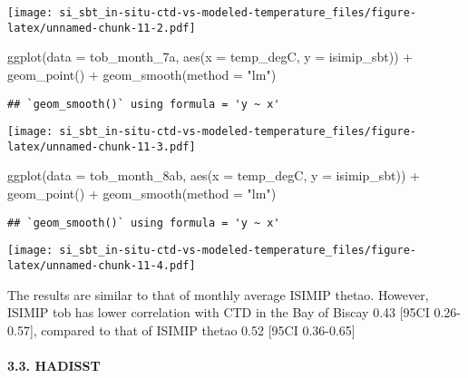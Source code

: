\documentclass[
]{article}
\newenvironment{Shaded}{\begin{snugshade}}{\end{snugshade}}
\newcommand{\AttributeTok}[1]{\textcolor[rgb]{0.77,0.63,0.00}{#1}}
\newcommand{\FunctionTok}[1]{\textcolor[rgb]{0.00,0.00,0.00}{#1}}
\newcommand{\NormalTok}[1]{#1}
\newcommand{\SpecialCharTok}[1]{\textcolor[rgb]{0.00,0.00,0.00}{#1}}
\newcommand{\StringTok}[1]{\textcolor[rgb]{0.31,0.60,0.02}{#1}}
\begin{document}
\texttt{[image: si\_sbt\_in-situ-ctd-vs-modeled-temperature\_files/figure-latex/unnamed-chunk-11-2.pdf]}

\begin{Shaded}
\begin{Highlighting}[]
\FunctionTok{ggplot}\NormalTok{(}\AttributeTok{data =}\NormalTok{ tob\_month\_7a, }\FunctionTok{aes}\NormalTok{(}\AttributeTok{x =}\NormalTok{ temp\_degC, }\AttributeTok{y =}\NormalTok{ isimip\_sbt)) }\SpecialCharTok{+} \FunctionTok{geom\_point}\NormalTok{() }\SpecialCharTok{+} \FunctionTok{geom\_smooth}\NormalTok{(}\AttributeTok{method =} \StringTok{"lm"}\NormalTok{)}
\end{Highlighting}
\end{Shaded}

\begin{verbatim}
## `geom_smooth()` using formula = 'y ~ x'
\end{verbatim}

\texttt{[image: si\_sbt\_in-situ-ctd-vs-modeled-temperature\_files/figure-latex/unnamed-chunk-11-3.pdf]}

\begin{Shaded}
\begin{Highlighting}[]
\FunctionTok{ggplot}\NormalTok{(}\AttributeTok{data =}\NormalTok{ tob\_month\_8ab, }\FunctionTok{aes}\NormalTok{(}\AttributeTok{x =}\NormalTok{ temp\_degC, }\AttributeTok{y =}\NormalTok{ isimip\_sbt)) }\SpecialCharTok{+} \FunctionTok{geom\_point}\NormalTok{() }\SpecialCharTok{+} \FunctionTok{geom\_smooth}\NormalTok{(}\AttributeTok{method =} \StringTok{"lm"}\NormalTok{)}
\end{Highlighting}
\end{Shaded}

\begin{verbatim}
## `geom_smooth()` using formula = 'y ~ x'
\end{verbatim}

\texttt{[image: si\_sbt\_in-situ-ctd-vs-modeled-temperature\_files/figure-latex/unnamed-chunk-11-4.pdf]}

The results are similar to that of monthly average ISIMIP thetao.
However, ISIMIP tob has lower correlation with CTD in the Bay of Biscay
0.43 {[}95CI 0.26-0.57{]}, compared to that of ISIMIP thetao 0.52
{[}95CI 0.36-0.65{]}

\hypertarget{hadisst}{%
\paragraph{3.3. HADISST}\label{hadisst}}
\end{document}
